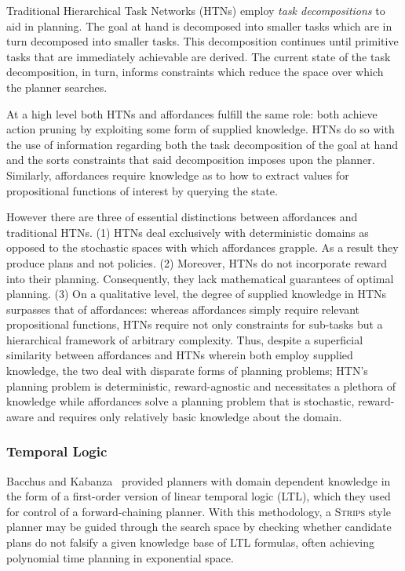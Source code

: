 \documentclass[conference]{IEEEtran}
\newcommand{\dnote}[1]{\textcolor{Green}{\textbf{}}}
\newcommand{\enote}[1]{\textcolor{Red}{\textbf{}}}
\begin{document}
\enote{I've been writing traditional as I expect we'll discover some HTNs that grapple with the issues stated below -- which we should probably cite}Traditional Hierarchical Task Networks (HTNs) employ \textit{task decompositions} to aid in planning. The goal at hand is decomposed into smaller tasks which are in turn decomposed into smaller tasks. This decomposition continues until primitive tasks that are immediately achievable are derived. The current state of the task decomposition, in turn, informs constraints which reduce the space over which the planner searches.

At a high level both HTNs and affordances fulfill the same role: both achieve action pruning by exploiting some form of supplied knowledge. HTNs do so with the use of information regarding both the task decomposition of the goal at hand and the sorts constraints that said decomposition imposes upon the planner. Similarly, affordances require knowledge as to how to extract values for propositional functions of interest by querying the state.

However there are three of essential distinctions between affordances and traditional HTNs. (1) HTNs deal exclusively with deterministic domains as opposed to the stochastic spaces with which affordances grapple. As a result they produce plans and not policies. (2) Moreover, HTNs do not incorporate reward into their planning. Consequently, they lack mathematical guarantees of optimal planning. \enote{I think.. We should double check this.} (3) On a qualitative level, the degree of supplied knowledge in HTNs surpasses that of affordances: whereas affordances simply require relevant propositional functions, HTNs require not only constraints for sub-tasks but a hierarchical framework of arbitrary complexity. Thus, despite a superficial similarity between affordances and HTNs wherein both employ supplied knowledge, the two deal with disparate forms of planning problems; HTN's planning problem is deterministic, reward-agnostic and necessitates a plethora of knowledge while affordances solve a planning problem that is stochastic, reward-aware and requires only relatively basic knowledge about the domain.
\enote{Need citations for HTNs}
\dnote{needs to be shorter}
\subsubsection{Temporal Logic}

Bacchus and Kabanza~\cite{Bacchus95usingtemporal,Bacchus99usingtemporal} provided
planners with domain dependent knowledge in the form of a first-order version of linear
temporal logic (LTL), which they used for control of a forward-chaining planner. With this methodology, 
a \textsc{Strips} style planner may be guided through the search space by checking 
whether candidate plans do not falsify a given knowledge base of LTL formulas, often
achieving polynomial time planning in exponential space.
\end{document}
